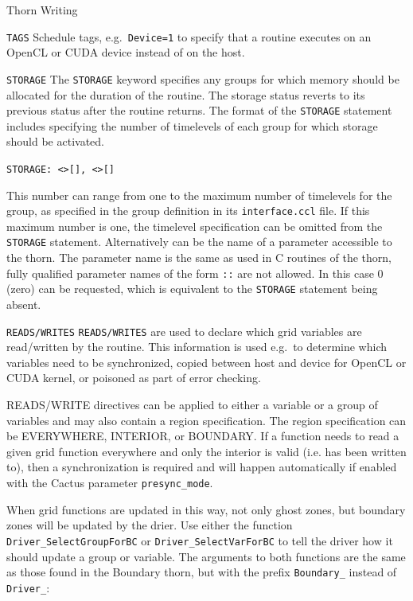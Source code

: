 \begin{cactuspart}{Thorn Writing}
\begin{Lentry}
\item[\texttt{TAGS}] Schedule tags, e.g.\ \texttt{Device=1} to specify
  that a routine executes on an OpenCL or CUDA device instead of on
  the host.

\item[\texttt{STORAGE}] The \texttt{STORAGE} keyword specifies any groups for
which memory should be allocated for the duration of the routine.  The
storage status reverts to its previous status after the routine
returns. The format of the \texttt{STORAGE} statement includes specifying
the number of timelevels of each group for which storage should be activated.

\texttt{STORAGE: <>[],
<>[]}

 This number can range from one to the maximum number of timelevels for the group, as specified in the group definition in its \texttt{interface.ccl} file. If this maximum number is one, the timelevel specification can be omitted from the
\texttt{STORAGE} statement.
Alternatively  can be the name of a parameter accessible
to the thorn. The parameter name is the same as used in C routines of the
thorn, fully qualified parameter names of the form
\texttt{::} are not allowed. In this case 0 (zero)
 can be requested, which is equivalent to the {\tt STORAGE}
statement being absent.

\item[\texttt{READS/WRITES}] \texttt{READS/WRITES} are used to
  declare which grid variables are read/written by the routine. This information is
  used e.g.\ to determine which variables need to be synchronized, copied between host
  and device for OpenCL or CUDA kernel, or poisoned as part of error checking. 

  READS/WRITE directives can be applied to either a variable or a group of
  variables and may also contain a region specification. The region specification can
  be EVERYWHERE, INTERIOR, or BOUNDARY. If a function needs to read a given grid function
  everywhere and only the interior is valid (i.e. has been written to), then a synchronization
  is required and will happen automatically if enabled with the Cactus parameter \texttt{presync\_mode}.

  When grid functions are updated in this way, not only ghost zones, but boundary zones
  will be updated by the drier.  Use either the function
  \texttt{Driver\_SelectGroupForBC} or \texttt{Driver\_SelectVarForBC} to tell the driver how it should update a group or variable. The
  arguments to both functions are the same as those found in the
  Boundary thorn, but with the prefix \texttt{Boundary\_} instead of
  \texttt{Driver\_}:


\end{Lentry}
\end{cactuspart}
